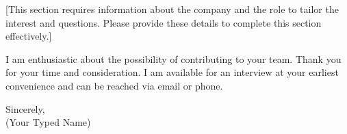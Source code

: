 \documentclass[letterpaper,11pt]{article}
\begin{document}
\vspace{10pt}

[This section requires information about the company and the role to tailor the interest and questions. Please provide these details to complete this section effectively.]
\vspace{10pt}

\vspace{10pt}

I am enthusiastic about the possibility of contributing to your team. Thank you for your time and consideration. I am available for an interview at your earliest convenience and can be reached via email or phone.
\vspace{20pt}

Sincerely, \\
\vspace{40pt} %
(Your Typed Name)

\end{document}
